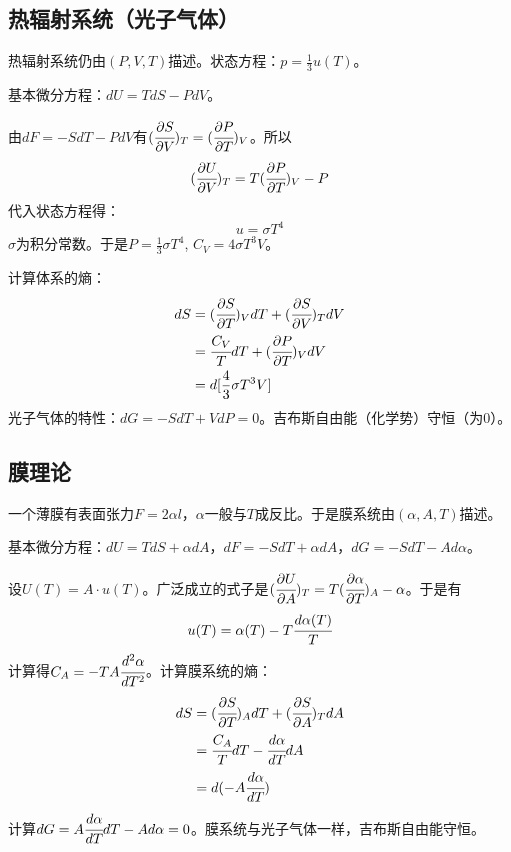 \documentclass[a4paper,12pt]{article}
\newcommand{\myp}[3]{(\cfrac{\partial{#1}}{\partial{#2}})_{#3}}
\begin{document}
\subsection{热辐射系统（光子气体）}
热辐射系统仍由$(P,V,T)$描述。状态方程：$p = \frac{1}{3}u(T)$。\par
基本微分方程：$dU = TdS - PdV$。\par
由$dF = -SdT - PdV$有$\myp{S}{V}{T} = \myp{P}{T}{V}$。所以
\begin{equation}
\myp{U}{V}{T} = T\myp{P}{T}{V} - P
\end{equation}
代入状态方程得：
\begin{equation}
u = \sigma T^4
\end{equation}
$\sigma$为积分常数。于是$P = \frac{1}{3}\sigma T^4$, $C_V = 4 \sigma T^3 V$。\par
计算体系的熵：
\begin{subequations}
\begin{align*}
dS &= \myp{S}{T}{V}dT + \myp{S}{V}{T} dV \\
   &= \cfrac{C_V}{T}dT + \myp{P}{T}{V}dV \\
   & = d[\frac{4}{3}\sigma T^3 V] \\
\end{align*}
\end{subequations}
\indent 光子气体的特性：$dG = -SdT + VdP = 0$。吉布斯自由能（化学势）守恒（为$0$）。

\subsection{膜理论}
一个薄膜有表面张力$F = 2 \alpha l$，$\alpha$一般与$T$成反比。于是膜系统由$(\alpha, A, T)$描述。\par
基本微分方程：$dU = TdS + \alpha dA$，$dF = -SdT + \alpha dA$，$dG = -SdT - Ad\alpha$。\par
设$U(T) = A \cdot u(T)$。广泛成立的式子是$\myp{U}{A}{T} = T\myp{\alpha}{T}{A} - \alpha$。于是有
\begin{equation}
u(T) = \alpha(T) - T\cfrac{d\alpha(T)}{T}
\end{equation}
计算得$C_A = -TA\cfrac{d^2\alpha}{dT^2}$。计算膜系统的熵：
\begin{subequations}
\begin{align*}
dS &= \myp{S}{T}{A}dT + \myp{S}{A}{T} dA \\
   &= \cfrac{C_A}{T}dT - \cfrac{d\alpha}{dT}dA \\
   &= d(- A \cfrac{d\alpha}{dT}) \\
\end{align*}
\end{subequations}
计算$dG = A \cfrac{d\alpha}{dT} dT - A d\alpha = 0$。膜系统与光子气体一样，吉布斯自由能守恒。
\end{document}
